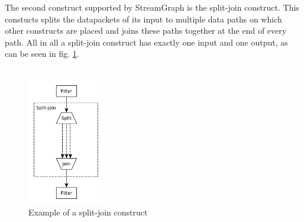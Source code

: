 \documentclass[journal]{IEEEtran}
\begin{document}
\noindent The second construct supported by StreamGraph is the split-join construct. 
This constucts splits the datapackets of its input to multiple data paths on which
other constructs are placed and joins these paths together at the end of every
path. All in all a split-join construct has exactly one input and one output, as can 
be seen in fig. \ref{fig_Split_Join}.\\
\\

\begin{figure}[h]
	\centering
	\includegraphics[width=0.3\textwidth]{SplitJoinGraphic}
	\caption{Example of a split-join construct}
	\label{fig_Split_Join}
\end{figure}
\end{document}
